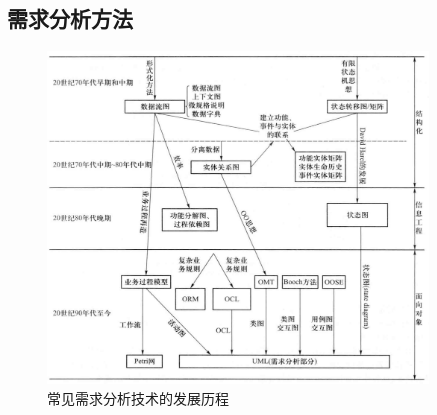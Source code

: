 \subsection{需求分析方法}
\begin{figure}[H]
	\centering
    \vspace{-0.5em}
	\includegraphics[width=0.9\textwidth]{img/常见需求分析技术的发展历程.png}
    \caption*{常见需求分析技术的发展历程}
    \vspace{-1em}
\end{figure}

